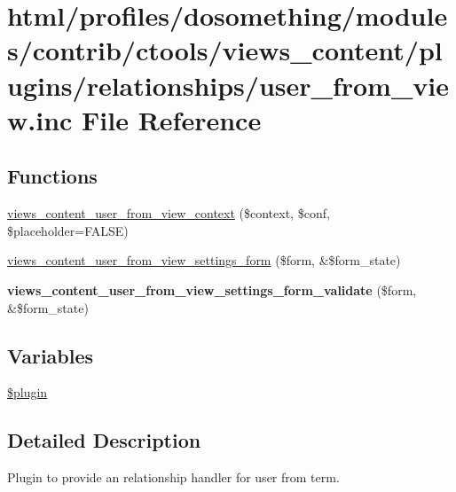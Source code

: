 \hypertarget{user__from__view_8inc}{
\section{html/profiles/dosomething/modules/contrib/ctools/views\_\-content/plugins/relationships/user\_\-from\_\-view.inc File Reference}
\label{user__from__view_8inc}
}
\subsection*{Functions}
\begin{DoxyCompactItemize}
\item 
\hyperlink{user__from__view_8inc_a2eb3547ffaeeecb5f44c5e06bf48512e}{views\_\-content\_\-user\_\-from\_\-view\_\-context} (\$context, \$conf, \$placeholder=FALSE)
\item 
\hyperlink{user__from__view_8inc_a8c17dd822c59313c8bb55e43fae9b692}{views\_\-content\_\-user\_\-from\_\-view\_\-settings\_\-form} (\$form, \&\$form\_\-state)
\item 
\hypertarget{user__from__view_8inc_a6d63c06ed042ef8283fb89d8a81f2df2}{
{\bfseries views\_\-content\_\-user\_\-from\_\-view\_\-settings\_\-form\_\-validate} (\$form, \&\$form\_\-state)}
\label{user__from__view_8inc_a6d63c06ed042ef8283fb89d8a81f2df2}

\end{DoxyCompactItemize}
\subsection*{Variables}
\begin{DoxyCompactItemize}
\item 
\hyperlink{user__from__view_8inc_ada8a7130088351710bb02ed622d6bf65}{\$plugin}
\end{DoxyCompactItemize}


\subsection{Detailed Description}
Plugin to provide an relationship handler for user from term. 

